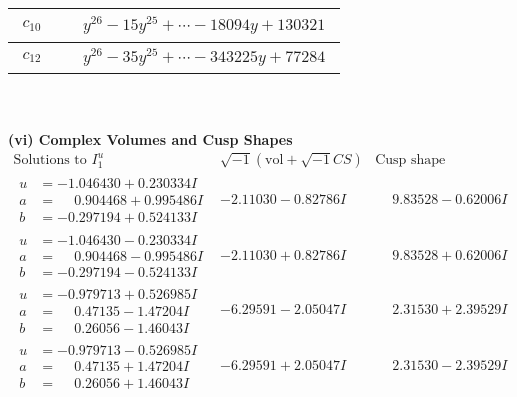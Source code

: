 \documentclass[1p]{elsarticle_modified}
\theoremstyle{definition}
\newcommand{\I}{\sqrt{-1}}
\begin{document}
\begin{tabular}{m{50pt}|m{274pt}}
\hline $$\begin{aligned}c_{10}\end{aligned}$$&$\begin{aligned}
&y^{26}-15 y^{25}+\cdots-18094 y+130321
\end{aligned}$\\
\hline $$\begin{aligned}c_{12}\end{aligned}$$&$\begin{aligned}
&y^{26}-35 y^{25}+\cdots-343225 y+77284
\end{aligned}$\\
\hline
\end{tabular}\\~\\
\newpage\flushleft \textbf{(vi) Complex Volumes and Cusp Shapes}
$$\begin{array}{c|c|c}  
\text{Solutions to }I^u_{1}& \I (\text{vol} + \sqrt{-1}CS) & \text{Cusp shape}\\
 \hline 
\begin{aligned}
u &= -1.046430 + 0.230334 I \\
a &= \phantom{-}0.904468 + 0.995486 I \\
b &= -0.297194 + 0.524133 I\end{aligned}
 & -2.11030 - 0.82786 I & \phantom{-}9.83528 - 0.62006 I \\ \hline\begin{aligned}
u &= -1.046430 - 0.230334 I \\
a &= \phantom{-}0.904468 - 0.995486 I \\
b &= -0.297194 - 0.524133 I\end{aligned}
 & -2.11030 + 0.82786 I & \phantom{-}9.83528 + 0.62006 I \\ \hline\begin{aligned}
u &= -0.979713 + 0.526985 I \\
a &= \phantom{-}0.47135 - 1.47204 I \\
b &= \phantom{-}0.26056 - 1.46043 I\end{aligned}
 & -6.29591 - 2.05047 I & \phantom{-}2.31530 + 2.39529 I \\ \hline\begin{aligned}
u &= -0.979713 - 0.526985 I \\
a &= \phantom{-}0.47135 + 1.47204 I \\
b &= \phantom{-}0.26056 + 1.46043 I\end{aligned}
 & -6.29591 + 2.05047 I & \phantom{-}2.31530 - 2.39529 I \\ \hline\begin{aligned}

\end{aligned}
\end{array}$$
\end{document}
